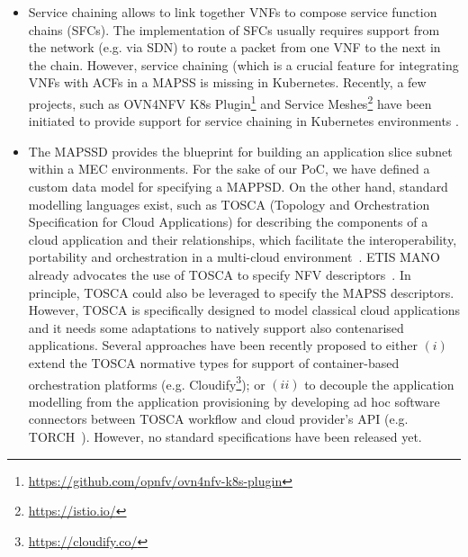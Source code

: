 \begin{itemize}[noitemsep,topsep=2pt]
    \item Service chaining allows to link together VNFs to compose service function chains (SFCs). The implementation of SFCs usually requires support from the network (e.g. via SDN) to route a packet from one VNF to the next in the chain. However, service chaining (which is a crucial feature for integrating VNFs with ACFs in a MAPSS is missing in Kubernetes. Recently, a few projects, such as OVN4NFV K8s Plugin\footnote{\url{https://github.com/opnfv/ovn4nfv-k8s-plugin}} and Service Meshes\footnote{\url{https://istio.io/}} have been initiated to provide support for service chaining in Kubernetes environments . 
    
    \item The MAPSSD provides the blueprint for building an application slice subnet within a MEC environments. For the sake of our PoC, we have defined a custom data model for specifying a MAPPSD. On the other hand, standard modelling languages exist, such as TOSCA (Topology and Orchestration Specification for Cloud Applications) for describing the components of a cloud application and their relationships, which facilitate the interoperability, portability and orchestration in a multi-cloud environment~\cite{2018_MCC_TOSCA}. ETIS MANO already advocates the use of TOSCA to specify NFV descriptors~\cite{NFV-SOL001}. In principle, TOSCA could also be leveraged to specify the MAPSS descriptors. However, TOSCA is specifically designed to model classical cloud applications and it needs some adaptations to natively support also contenarised applications. Several approaches have been recently proposed to either $(i)$ extend the TOSCA normative types for support of container-based orchestration platforms (e.g. Cloudify\footnote{\url{https://cloudify.co/}}); or $(ii)$ to decouple the application modelling from the application provisioning by developing ad hoc software connectors between TOSCA workflow and cloud provider’s API (e.g. TORCH~\cite{2021_jgc_torch}). However, no standard specifications have been released yet.  
\end{itemize}


